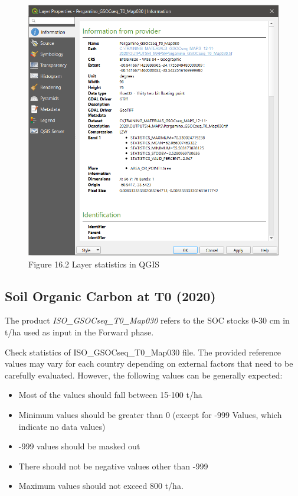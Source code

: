 \documentclass[
  10pt,
  b5paper,
]{book}
\providecommand{\tightlist}{%
  \setlength{\itemsep}{0pt}\setlength{\parskip}{0pt}}
\begin{document}
\begin{figure}
\centering
\includegraphics{images/Figure_16.2.png}
\caption{Figure 16.2 Layer statistics in QGIS}
\end{figure}

\hypertarget{soil-organic-carbon-at-t0-2020}{%
\subsection*{Soil Organic Carbon at T0 (2020)}\label{soil-organic-carbon-at-t0-2020}}

The product \emph{ISO\_GSOCseq\_T0\_Map030} refers to the SOC stocks 0-30 cm in t/ha used as input in the Forward phase.

Check statistics of ISO\_GSOCseq\_T0\_Map030 file. The provided reference values may vary for each country depending on external factors that need to be carefully evaluated. However, the following values can be generally expected:

\begin{itemize}
\tightlist
\item
  Most of the values should fall between 15-100 t/ha
\item
  Minimum values should be greater than 0 (except for -999 Values, which indicate no data values)
\item
  -999 values should be masked out
\item
  There should not be negative values other than -999
\item
  Maximum values should not exceed 800 t/ha.
\end{itemize}
\end{document}
